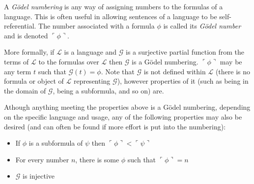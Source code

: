 \documentclass[12pt]{article}
\begin{document}
A \emph{G\"odel numbering} is any way of assigning numbers to the formulas of a language. This is often useful in allowing sentences of a language to be self-referential.  The number associated with a formula $\phi$ is called its \emph{G\"odel number} and is denoted $\ulcorner\phi\urcorner$.

More formally, if $\mathcal{L}$ is a language and $\mathcal{G}$ is a surjective partial function from the terms of $\mathcal{L}$ to the formulas over $\mathcal{L}$ then $\mathcal{G}$ is a G\"odel numbering.  $\ulcorner\phi\urcorner$ may be any term $t$ such that $\mathcal{G}(t)=\phi$.  Note that $\mathcal{G}$ is not defined within $\mathcal{L}$ (there is no formula or object of $\mathcal{L}$ representing $\mathcal{G}$), however properties of it (such as being in the domain of $\mathcal{G}$, being a subformula, and so on) are.

Athough anything meeting the properties above is a G\"odel numbering, depending on the specific language and usage, any of the following properties may also be desired (and can often be found if more effort is put into the numbering):

\begin{itemize}
\item If $\phi$ is a subformula of $\psi$ then $\ulcorner\phi\urcorner<\ulcorner\psi\urcorner$

\item For every number $n$, there is some $\phi$ such that $\ulcorner\phi\urcorner=n$

\item $\mathcal{G}$ is injective
\end{itemize}
\end{document}
